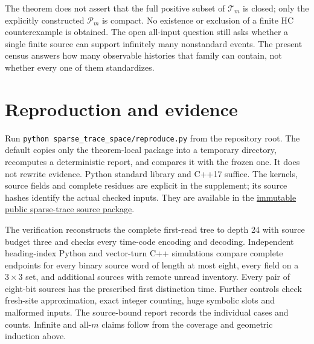 \documentclass[11pt]{article}
\theoremstyle{definition}\newtheorem{definition}[theorem]{Definition}
\theoremstyle{remark}\newtheorem{remark}[theorem]{Remark}
\newcommand{\Tr}{\mathcal T}
\newcommand{\Pos}{\mathcal P}
\begin{document}
The theorem does not assert that the full positive subset of $\Tr_m$ is closed;
only the explicitly constructed $\Pos_m$ is compact. No existence or exclusion
of a finite HC counterexample is obtained. The open all-input question still
asks whether a single finite source can support infinitely many nonstandard
events. The present census answers how many observable histories that family
can contain, not whether every one of them standardizes.

\section{Reproduction and evidence}
Run \texttt{python sparse\_trace\_space/reproduce.py} from the repository
root. The default copies only the theorem-local package into a temporary
directory, recomputes a deterministic report, and compares it with the frozen
one. It does not rewrite evidence. Python standard library and C++17 suffice.
The kernels, source fields and complete residues are explicit in the supplement;
its source hashes identify the actual checked inputs. They are available in
the \href{https://github.com/kehao95/langtons-ant-core/tree/3ae4ce12abf6ad44a5c7625b31d25e6f1365ffa3/sparse_trace_space}{immutable public sparse-trace source package}.

The verification reconstructs the complete first-read tree to depth 24 with
source budget three and checks every time-code encoding and decoding.
Independent heading-index Python and vector-turn C++ simulations compare
complete endpoints for every binary source word of length at most eight,
every field on a $3\times3$ set, and additional sources with remote unread
inventory. Every pair of eight-bit sources has the prescribed first distinction
time. Further controls check fresh-site approximation, exact integer counting,
huge symbolic slots and malformed inputs. The source-bound report records the
individual cases and counts. Infinite and all-$m$ claims follow from the
coverage and geometric induction above.

\appendix
\end{document}

